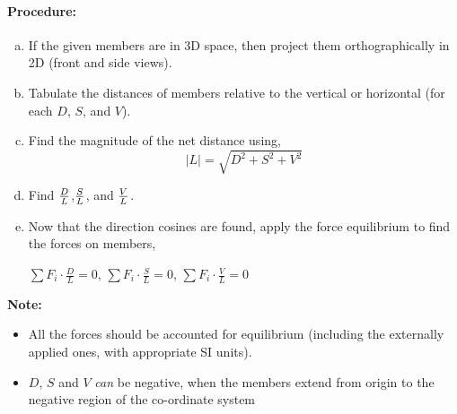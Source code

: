 \documentclass{article}
\begin{document}
{\paragraph{\Large Procedure:}
\begin{enumerate}[(a)]
\item If the given members are in 3D space, then project them orthographically in 2D (front and side views).
\item Tabulate the distances of members relative to the vertical or horizontal (for each $D$, $S$, and $V$).
\item Find the magnitude of the net distance using,
{\LARGE $$|L|=\sqrt{D^2+S^2+V^2}$$}
\item Find {\LARGE $D\over L$},{\LARGE $S\over L$}, and {\LARGE $V\over L$}.
\item Now that the direction cosines are found, apply the force equilibrium to find the forces on members,
\begin{center}
{\LARGE $\sum F_i\cdot \frac{D}L=0$}, {\LARGE $\sum F_i\cdot \frac{S}L=0$}, {\LARGE $\sum F_i\cdot \frac{V}L=0$}
\end{center}
\end{enumerate}
$\ $
\\
\textbf{\Large Note:} 
\begin{itemize}
\item All the forces should be accounted for equilibrium (including the externally applied ones, with appropriate SI units).
\item $D$, $S$ and $V$ \textit{can} be negative, when the members extend from origin to the negative region of the co-ordinate system
\end{itemize}
\newpage
}
\end{document}
